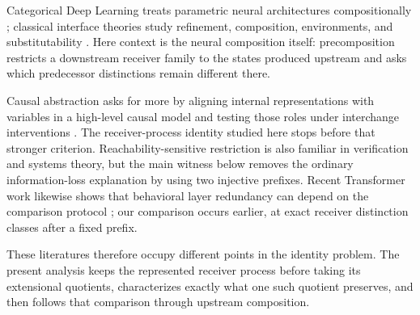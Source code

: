 Categorical Deep Learning treats parametric neural architectures compositionally \citep{gavranovic2024categorical}; classical interface theories study refinement, composition, environments, and substitutability \citep{tripakis2011interfaces,broy1997compositional}. Here context is the neural composition itself: precomposition restricts a downstream receiver family to the states produced upstream and asks which predecessor distinctions remain different there.

Causal abstraction asks for more by aligning internal representations with variables in a high-level causal model and testing those roles under interchange interventions \citep{geiger2022causal}. The receiver-process identity studied here stops before that stronger criterion. Reachability-sensitive restriction is also familiar in verification and systems theory, but the main witness below removes the ordinary information-loss explanation by using two injective prefixes. Recent Transformer work likewise shows that behavioral layer redundancy can depend on the comparison protocol \citep{garcia2026nofreeswap}; our comparison occurs earlier, at exact receiver distinction classes after a fixed prefix.

These literatures therefore occupy different points in the identity problem. The present analysis keeps the represented receiver process before taking its extensional quotients, characterizes exactly what one such quotient preserves, and then follows that comparison through upstream composition.
